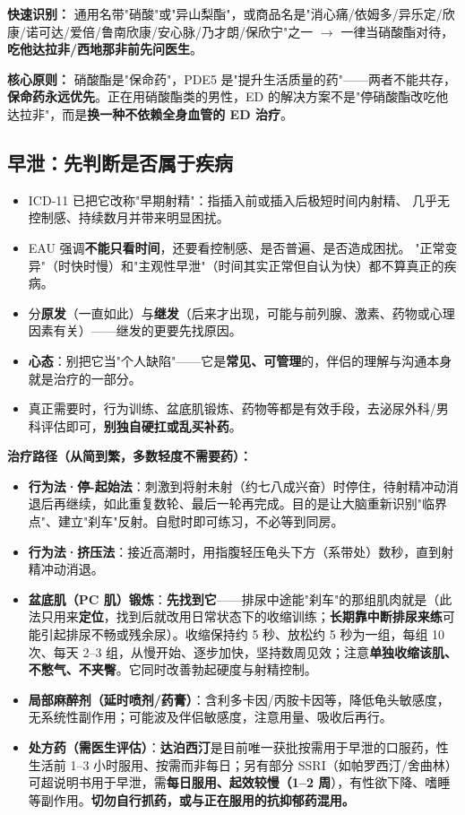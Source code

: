 \documentclass[12pt,UTF8,openany]{ctexbook}
\begin{document}
\textbf{快速识别：} 通用名带"硝酸"或"异山梨酯"，或商品名是"消心痛/依姆多/异乐定/欣康/诺可达/爱倍/鲁南欣康/安心脉/乃才朗/保欣宁"之一 $\to$ 一律当硝酸酯对待，\textbf{吃他达拉非/西地那非前先问医生}。

\textbf{核心原则：} 硝酸酯是"保命药"，PDE5 是"提升生活质量的药"——两者不能共存，\textbf{保命药永远优先}。正在用硝酸酯类的男性，ED 的解决方案不是"停硝酸酯改吃他达拉非"，而是\textbf{换一种不依赖全身血管的 ED 治疗}。

\subsection*{早泄：先判断是否属于疾病}

\begin{itemize}[leftmargin=2em]
  \item ICD-11 已把它改称"早期射精"：指插入前或插入后极短时间内射精、
        几乎无控制感、持续数月并带来明显困扰。
  \item EAU 强调\textbf{不能只看时间}，还要看控制感、是否普遍、是否造成困扰。
        "正常变异"（时快时慢）和"主观性早泄"（时间其实正常但自认为快）都不算真正的疾病。
  \item 分\textbf{原发}（一直如此）与\textbf{继发}（后来才出现，可能与前列腺、激素、药物或心理因素有关）——继发的更要先找原因。
  \item \textbf{心态}：别把它当"个人缺陷"——它是\textbf{常见、可管理}的，伴侣的理解与沟通本身就是治疗的一部分。
  \item 真正需要时，行为训练、盆底肌锻炼、药物等都是有效手段，去泌尿外科/男科评估即可，\textbf{别独自硬扛或乱买补药}。
\end{itemize}

\textbf{治疗路径（从简到繁，多数轻度不需要药）：}

\begin{itemize}[leftmargin=2em,itemsep=0.3em]
  \item \textbf{行为法·停-起始法}：刺激到将射未射（约七八成兴奋）时停住，待射精冲动消退后再继续，如此重复数轮、最后一轮再完成。目的是让大脑重新识别"临界点"、建立"刹车"反射。自慰时即可练习，不必等到同房。
  \item \textbf{行为法·挤压法}：接近高潮时，用指腹轻压龟头下方（系带处）数秒，直到射精冲动消退。
  \item \textbf{盆底肌（PC 肌）锻炼}：\textbf{先找到它}——排尿中途能"刹车"的那组肌肉就是（此法只用来\textbf{定位}，找到后就改用日常状态下的收缩训练；\textbf{长期靠中断排尿来练}可能引起排尿不畅或残余尿）。收缩保持约 5 秒、放松约 5 秒为一组，每组 10 次、每天 2--3 组，从慢开始、逐步加快，坚持数周见效；注意\textbf{单独收缩该肌、不憋气、不夹臀}。它同时改善勃起硬度与射精控制。
  \item \textbf{局部麻醉剂（延时喷剂/药膏）}：含利多卡因/丙胺卡因等，降低龟头敏感度，无系统性副作用；可能波及伴侣敏感度，注意用量、吸收后再行。
  \item \textbf{处方药（需医生评估）}：\textbf{达泊西汀}是目前唯一获批按需用于早泄的口服药，性生活前 1--3 小时服用、按需而非每日；另有部分 SSRI（如帕罗西汀/舍曲林）可超说明书用于早泄，需\textbf{每日服用、起效较慢（1--2 周}），有性欲下降、嗜睡等副作用。\textbf{切勿自行抓药，或与正在服用的抗抑郁药混用。}
\end{itemize}
\end{document}
